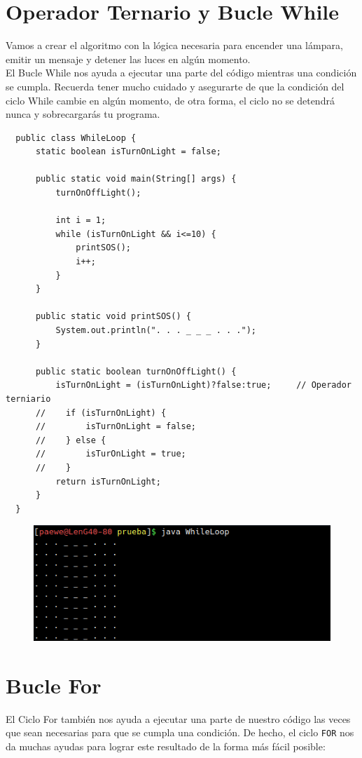 \documentclass{article}
\begin{document}
\section{Operador Ternario y Bucle While}%
Vamos a crear el algoritmo con la lógica necesaria para encender una lámpara,
emitir un mensaje y detener las luces en algún momento.\\

El Bucle While nos ayuda a ejecutar una parte del código mientras una condición
se cumpla. Recuerda tener mucho cuidado y asegurarte de que la condición del
ciclo While cambie en algún momento, de otra forma, el ciclo no se detendrá
nunca y sobrecargarás tu programa.

\newpage

\begin{verbatim}
  public class WhileLoop {
      static boolean isTurnOnLight = false;

      public static void main(String[] args) {
          turnOnOffLight();

          int i = 1;
          while (isTurnOnLight && i<=10) {
              printSOS();
              i++;
          }
      }

      public static void printSOS() {
          System.out.println(". . . _ _ _ . . .");
      }

      public static boolean turnOnOffLight() {
          isTurnOnLight = (isTurnOnLight)?false:true;     // Operador terniario
      //    if (isTurnOnLight) {
      //        isTurnOnLight = false;
      //    } else {
      //        isTurOnLight = true;
      //    }
          return isTurnOnLight;
      }
  }
\end{verbatim}

\begin{figure}[h!]
  \centering
  \includegraphics[scale=0.75]{./Pictures/055_dowhile.png}
\end{figure}

\newpage

\section{Bucle For}%
El Ciclo For también nos ayuda a ejecutar una parte de nuestro código las veces
que sean necesarias para que se cumpla una condición. De hecho, el ciclo
\texttt{FOR} nos da muchas ayudas para lograr este resultado de la forma más
fácil posible:\\
\end{document}
